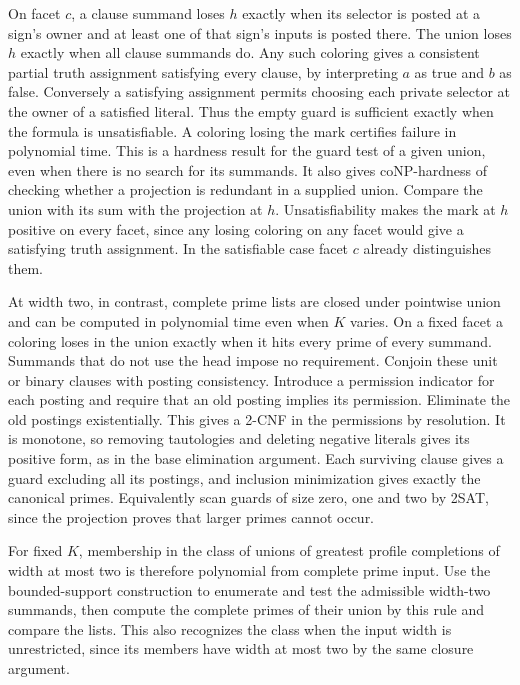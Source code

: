 On facet $c$, a clause summand loses $h$ exactly when its
selector is posted at a sign's owner and at least one of
that sign's inputs is posted there. The union loses $h$
exactly when all clause summands do. Any such coloring gives
a consistent partial truth assignment satisfying every
clause, by interpreting $a$ as true and $b$ as false. Conversely
a satisfying assignment permits choosing each private selector
at the owner of a satisfied literal. Thus the empty guard is
sufficient exactly when the formula is unsatisfiable. A
coloring losing the mark certifies failure in polynomial
time. This is a hardness result for the guard test of a given
union, even when there is no search for its summands.
It also gives coNP-hardness of checking whether a projection
is redundant in a supplied union. Compare the union with its
sum with the projection at $h$. Unsatisfiability makes the
mark at $h$ positive on every facet, since any losing coloring
on any facet would give a satisfying truth assignment. In
the satisfiable case facet $c$ already distinguishes them.

At width two, in contrast, complete prime lists are closed
under pointwise union and can be computed in polynomial time
even when $K$ varies. On a fixed facet a coloring loses in
the union exactly when it hits every prime of every summand.
Summands that do not use the head impose no requirement.
Conjoin these unit or binary clauses with posting consistency.
Introduce a permission indicator for each posting and require
that an old posting implies its permission. Eliminate the old
postings existentially. This gives a 2-CNF in the permissions
by resolution. It is monotone, so removing tautologies and
deleting negative literals gives its positive form, as in the
base elimination argument. Each surviving clause gives a
guard excluding all its postings, and inclusion minimization
gives exactly the canonical primes. Equivalently scan guards
of size zero, one and two by 2SAT, since the projection proves
that larger primes cannot occur.

For fixed $K$, membership in the class of unions of greatest
profile completions of width at most two is therefore polynomial
from complete prime input. Use the bounded-support construction
to enumerate and test the admissible width-two summands, then
compute the complete primes of their union by this rule and
compare the lists. This also recognizes the class when the
input width is unrestricted, since its members have width at
most two by the same closure argument.

